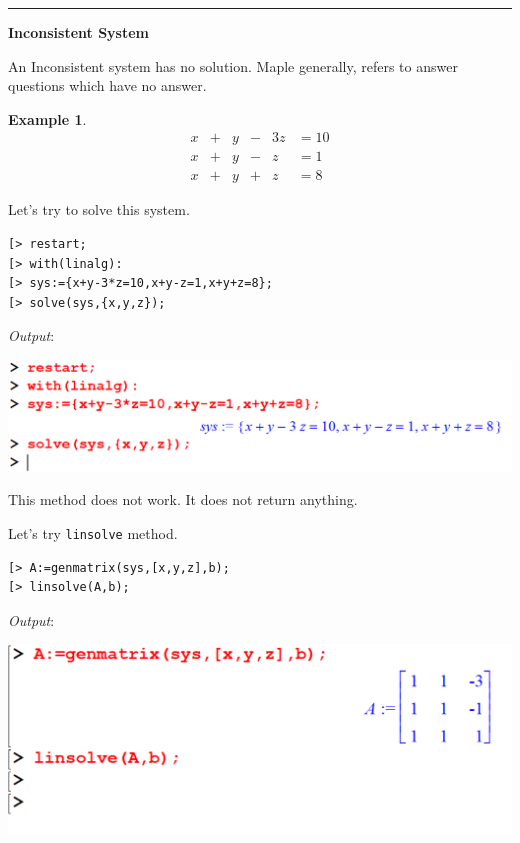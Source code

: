 \documentclass[
]{book}
\theoremstyle{definition}
\theoremstyle{definition}
\newtheorem{example}{Example}[chapter]
\theoremstyle{definition}
\theoremstyle{definition}
\theoremstyle{remark}
\begin{document}
\begin{center}\rule{0.5\linewidth}{0.5pt}\end{center}

\textbf{Inconsistent System}

An Inconsistent system has no solution. Maple generally, refers to answer questions which have no answer.

\begin{example}
\protect\hypertarget{exm:unnamed-chunk-25}{}\label{exm:unnamed-chunk-25}\[
\begin{array}{ccccccccc}
x &+& y &-& 3z &= 10\\
x &+& y &-&  z &= 1\\
x &+& y &+&  z &= 8  
\end{array}
\]
\end{example}

Let's try to solve this system.

\begin{verbatim}
[> restart;
[> with(linalg):
[> sys:={x+y-3*z=10,x+y-z=1,x+y+z=8};
[> solve(sys,{x,y,z});
\end{verbatim}

\emph{Output}:

\includegraphics{figures/Lesson 5/fig11.png}

This method does not work. It does not return anything.

Let's try \texttt{linsolve} method.

\begin{verbatim}
[> A:=genmatrix(sys,[x,y,z],b);
[> linsolve(A,b);
\end{verbatim}

\emph{Output}:

\includegraphics{figures/Lesson 5/fig12.png}
\end{document}
